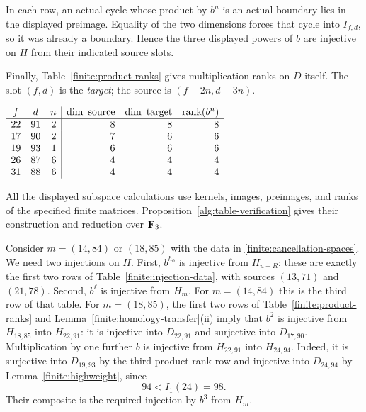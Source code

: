 In each row, an actual cycle whose product by $b^n$ is an actual
boundary lies in the displayed preimage.  Equality of the two
dimensions forces that cycle into $I^-_{f,d}$, so it was already
a boundary.  Hence the three displayed powers of $b$ are injective
on $H$ from their indicated source slots.

Finally, Table~\ref{finite:product-ranks} gives multiplication ranks
on $D$ itself.  The slot $(f,d)$ is the \emph{target}; the source is
$(f-2n,d-3n)$.

\begin{table}[htbp]
\centering
\(
\begin{array}{ccr|rrr}
 f&d&n&\dim\text{ source}&\dim\text{ target}&\operatorname{rank}(b^n)\\\hline
 22&91&2&8&8&8\\
 17&90&2&7&6&6\\
 19&93&1&6&6&6\\
 26&87&6&4&4&4\\
 31&88&6&4&4&4
\end{array}
\)
\caption{Ranks of multiplication by powers of $b$ on $D$.}
\label{finite:product-ranks}
\end{table}

All the displayed subspace calculations use kernels, images,
preimages, and ranks of the specified finite matrices.
Proposition~\ref{alg:table-verification} gives their
construction and reduction over $\mathbf F_3$.

Consider $m=(14,84)$ or $(18,85)$ with the data in
\eqref{finite:cancellation-spaces}.  We need two injections on $H$.
First, $b^{h_0}$ is injective from $H_{u+R}$: these are exactly
the first two rows of Table~\ref{finite:injection-data}, with sources
$(13,71)$ and $(21,78)$.  Second, $b^\ell$ is injective from
$H_m$.  For $m=(14,84)$ this is the third row of that table.
For $m=(18,85)$, the first two rows of
Table~\ref{finite:product-ranks} and
Lemma~\ref{finite:homology-transfer}\textup{(ii)} imply that $b^2$
is injective from $H_{18,85}$ into $H_{22,91}$: it is injective
into $D_{22,91}$ and surjective into $D_{17,90}$.
Multiplication by one further $b$ is injective from $H_{22,91}$
into $H_{24,94}$.  Indeed, it is surjective into $D_{19,93}$ by
the third product-rank row and injective into $D_{24,94}$ by
Lemma~\ref{finite:highweight}, since
\[
 94<I_1(24)=98.
\]
Their composite is the required injection by $b^3$ from $H_m$.

